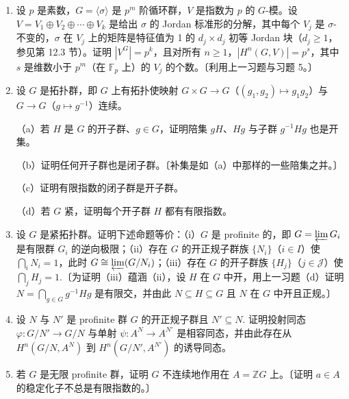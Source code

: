 \begin{enumerate}
（a）证明 \(d \leq p^m\).〔利用初等 Jordan 块的极小多项式的相关事实。〕

（b）证明 \(\dim_{\mathbb{F}_p}W^G = 1\).

（c）证明 \(\dim_{\mathbb{F}_p}(\sigma-1)W = d-1\).

（d）若 \(N = 1+\sigma+\cdots+\sigma^{p^m-1}\) 是通常的范元素，证明 \(NW\) 的维数为 1（当 \(d = p^m\) 时）、为 0（当 \(d < p^m\) 时），而 \({}_NW\) 的维数为 \(d-1\)（分别为 \(d\)）。〔设 \(R = \mathbb{F}_pG\)，证明 \(R\) 的每个非零 \(R\)-子模都含有 \(N\). 注意 \(W\) 是循环 \(R\)-模，设 \(\varphi : R \to W\) 是满同态，并由此若 \(\varphi\) 不是同构则 \(N \in \ker\varphi\).〕

（e）由此证明若 \(d = p^m\) 则对所有 \(n \geq 1\) 有 \(H^n(G, W) = 0\)，若 \(d < p^m\) 则对所有 \(n \geq 1\)，\(H^n(G, W)\) 的阶为 \(p\)（即这些上同调群为零当且仅当 \(W\) 是自由 \(\mathbb{F}_pG\)-模）。

\item 设 \(p\) 是素数，\(G = \langle\sigma\rangle\) 是 \(p^m\) 阶循环群，\(V\) 是指数为 \(p\) 的 \(G\)-模。设 \(V = V_1 \oplus V_2 \oplus \cdots \oplus V_k\) 是给出 \(\sigma\) 的 Jordan 标准形的分解，其中每个 \(V_j\) 是 \(\sigma\)-不变的，\(\sigma\) 在 \(V_j\) 上的矩阵是特征值为 1 的 \(d_j \times d_j\) 初等 Jordan 块（\(d_j \geq 1\)，参见第 12.3 节）。证明 \(|V^G| = p^k\)，且对所有 \(n \geq 1\)，\(|H^n(G, V)| = p^s\)，其中 \(s\) 是维数小于 \(p^m\)（在 \(\mathbb{F}_p\) 上）的 \(V_j\) 的个数。〔利用上一习题与习题 5。〕

\item 设 \(G\) 是拓扑群，即 \(G\) 上有拓扑使映射 \(G \times G \to G\)（\((g_1,g_2) \mapsto g_1g_2\)）与 \(G \to G\)（\(g \mapsto g^{-1}\)）连续。

（a）若 \(H\) 是 \(G\) 的开子群、\(g \in G\)，证明陪集 \(gH\)、\(Hg\) 与子群 \(g^{-1}Hg\) 也是开集。

（b）证明任何开子群也是闭子群。〔补集是如（a）中那样的一些陪集之并。〕

（c）证明有限指数的闭子群是开子群。

（d）若 \(G\) 紧，证明每个开子群 \(H\) 都有有限指数。

\item 设 \(G\) 是紧拓扑群。证明下述命题等价：（i）\(G\) 是 profinite 的，即 \(G = \varprojlim G_i\) 是有限群 \(G_i\) 的逆向极限；（ii）存在 \(G\) 的开正规子群族 \(\{N_i\}\)（\(i \in I\)）使 \(\bigcap_iN_i = 1\)，此时 \(G \cong \varprojlim(G/N_i)\)；（iii）存在 \(G\) 的开子群族 \(\{H_j\}\)（\(j \in \mathcal{J}\)）使 \(\bigcap_jH_j = 1\).〔为证明（iii）蕴涵（ii），设 \(H\) 在 \(G\) 中开，用上一习题（d）证明 \(N = \bigcap_{g \in G}g^{-1}Hg\) 是有限交，并由此 \(N \subseteq H \subseteq G\) 且 \(N\) 在 \(G\) 中开且正规。〕

\item 设 \(N\) 与 \(N'\) 是 profinite 群 \(G\) 的开正规子群且 \(N' \subseteq N\). 证明投射同态 \(\varphi : G/N' \to G/N\) 与单射 \(\psi : A^N \to A^{N'}\) 是相容同态，并由此存在从 \(H^n(G/N, A^N)\) 到 \(H^n(G/N', A^{N'})\) 的诱导同态。

\item 若 \(G\) 是无限 profinite 群，证明 \(G\) 不连续地作用在 \(A = \mathbb{Z}G\) 上。〔证明 \(a \in A\) 的稳定化子不总是有限指数的。〕
\end{enumerate}
